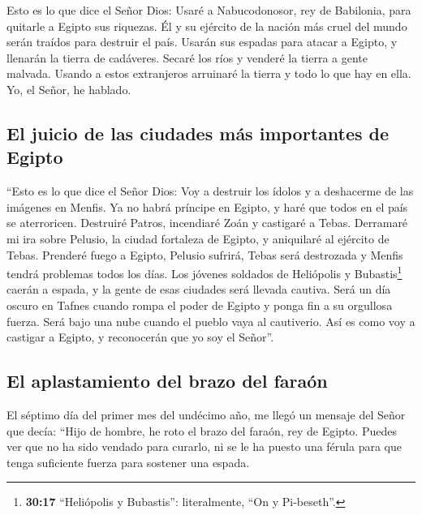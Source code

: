  Esto es lo que dice el Señor Dios: Usaré a
Nabucodonosor, rey de Babilonia, para quitarle a Egipto sus riquezas.
 Él y su ejército de la nación más cruel del mundo serán
traídos para destruir el país. Usarán sus espadas para atacar a Egipto,
y llenarán la tierra de cadáveres.  Secaré los ríos y
venderé la tierra a gente malvada. Usando a estos extranjeros arruinaré
la tierra y todo lo que hay en ella. Yo, el Señor, he hablado.

\hypertarget{el-juicio-de-las-ciudades-muxe1s-importantes-de-egipto}{%
\subsection{El juicio de las ciudades más importantes de
Egipto}\label{el-juicio-de-las-ciudades-muxe1s-importantes-de-egipto}}

 ``Esto es lo que dice el Señor Dios: Voy a destruir los
ídolos y a deshacerme de las imágenes en Menfis. Ya no habrá príncipe en
Egipto, y haré que todos en el país se aterroricen. 
Destruiré Patros, incendiaré Zoán y castigaré a Tebas. 
Derramaré mi ira sobre Pelusio, la ciudad fortaleza de Egipto, y
aniquilaré al ejército de Tebas.  Prenderé fuego a
Egipto, Pelusio sufrirá, Tebas será destrozada y Menfis tendrá problemas
todos los días.  Los jóvenes soldados de Heliópolis y
Bubastis\footnote{\textbf{30:17} ``Heliópolis y Bubastis'':
  literalmente, ``On y Pi-beseth''.} caerán a espada, y la gente de esas
ciudades será llevada cautiva.  Será un día oscuro en
Tafnes cuando rompa el poder de Egipto y ponga fin a su orgullosa
fuerza. Será bajo una nube cuando el pueblo vaya al cautiverio.
 Así es como voy a castigar a Egipto, y reconocerán que
yo soy el Señor''.

\hypertarget{el-aplastamiento-del-brazo-del-farauxf3n}{%
\subsection{El aplastamiento del brazo del
faraón}\label{el-aplastamiento-del-brazo-del-farauxf3n}}

 El séptimo día del primer mes del undécimo año, me llegó
un mensaje del Señor que decía:  ``Hijo de hombre, he
roto el brazo del faraón, rey de Egipto. Puedes ver que no ha sido
vendado para curarlo, ni se le ha puesto una férula para que tenga
suficiente fuerza para sostener una espada.

